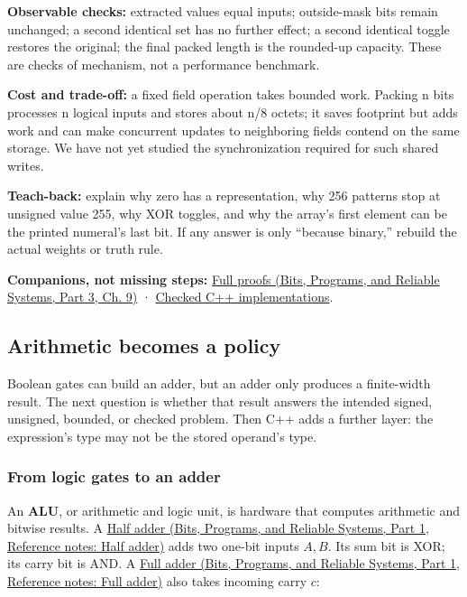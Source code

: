 \textbf{Observable checks:} extracted values equal inputs; outside-mask bits remain unchanged; a second identical set has no further effect; a second identical toggle restores the original; the final packed length is the rounded-up capacity. These are checks of mechanism, not a performance benchmark.

\textbf{Cost and trade-off:} a fixed field operation takes bounded work. Packing n bits processes n logical inputs and stores about n/8 octets; it saves footprint but adds work and can make concurrent updates to neighboring fields contend on the same storage. We have not yet studied the synchronization required for such shared writes.

\textbf{Teach-back:} explain why zero has a representation, why 256 patterns stop at unsigned value 255, why XOR toggles, and why the array's first element can be the printed numeral's last bit. If any answer is only ``because binary,'' rebuild the actual weights or truth rule.

\textbf{Companions, not missing steps:} \href{../01-Bits-Programs-and-Reliable-Systems-P03/main.pdf\#01-foundations-i-ch011-m001---positional-value-masks-fields-and-de-morgan}{Full proofs (Bits, Programs, and Reliable Systems, Part 3, Ch. 9)} · \hyperref[appendix-4e2236f53445-m001---width-safe-fields-and-lsb-first-bit-packing]{Checked C++ implementations}.

\subsection{Arithmetic becomes a policy}\label{05-engine-i-ch001-arithmetic-becomes-a-policy}

\hypertarget{05-engine-i-ch001-arithmetic-becomes-a-policy}{}

Boolean gates can build an adder, but an adder only produces a finite-width result. The next question is whether that result answers the intended signed, unsigned, bounded, or checked problem. Then C++ adds a further layer: the expression's type may not be the stored operand's type.

\subsubsection{From logic gates to an adder}\label{05-engine-i-ch001-from-logic-gates-to-an-adder}

\hypertarget{05-engine-i-ch001-from-logic-gates-to-an-adder}{}

An \textbf{ALU}, or arithmetic and logic unit, is hardware that computes arithmetic and bitwise results. A \href{../01-Bits-Programs-and-Reliable-Systems-P01/main.pdf\#appendix-1652d27a8e90}{Half adder (Bits, Programs, and Reliable Systems, Part 1, Reference notes: Half adder)} adds two one-bit inputs \(A,B\). Its sum bit is XOR; its carry bit is AND. A \href{../01-Bits-Programs-and-Reliable-Systems-P01/main.pdf\#appendix-d1a5b1e520c2}{Full adder (Bits, Programs, and Reliable Systems, Part 1, Reference notes: Full adder)} also takes incoming carry \(c\):

